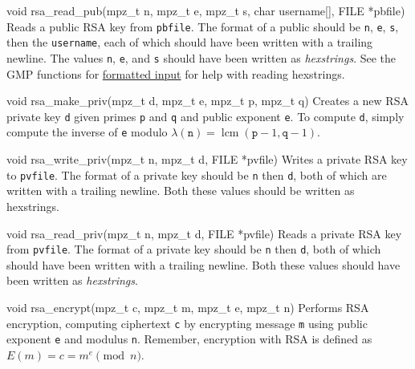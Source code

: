 \begin{funcdoc}{void rsa\_read\_pub(mpz\_t n, mpz\_t e, mpz\_t s,
char username[], FILE *pbfile)}
  Reads a public RSA key from \texttt{pbfile}. The format of a public
  should be \texttt{n}, \texttt{e}, \texttt{s}, then the
  \texttt{username}, each of which should have been written with a
  trailing newline. The values \texttt{n}, \texttt{e}, and \texttt{s}
  should have been written as \emph{hexstrings}. See the GMP functions
  for
  \href{https://gmplib.org/manual/Formatted-Input-Functions}{formatted
  input} for help with reading hexstrings.
\end{funcdoc}

\begin{funcdoc}{void rsa\_make\_priv(mpz\_t d, mpz\_t e, mpz\_t
p, mpz\_t q)}
  Creates a new RSA private key \texttt{d} given primes \texttt{p} and
  \texttt{q} and public exponent \texttt{e}. To compute \texttt{d}, simply
  compute the inverse of \texttt{e} modulo $\lambda(\texttt{n}) =
  \operatorname{lcm}(\texttt{p} - 1, \texttt{q} - 1)$.
\end{funcdoc}

\begin{funcdoc}{void rsa\_write\_priv(mpz\_t n, mpz\_t d, FILE
*pvfile)}
  Writes a private RSA key to \texttt{pvfile}. The format of a private key
  should be \texttt{n} then \texttt{d}, both of which are written with a
  trailing newline. Both these values should be written as hexstrings.
\end{funcdoc}

\begin{funcdoc}{void rsa\_read\_priv(mpz\_t n, mpz\_t d, FILE
*pvfile)}
  Reads a private RSA key from \texttt{pvfile}. The format of a private
  key should be \texttt{n} then \texttt{d}, both of which should have
  been written with a trailing newline. Both these values should have
  been written as \emph{hexstrings}.
\end{funcdoc}

\begin{funcdoc}{void rsa\_encrypt(mpz\_t c, mpz\_t m, mpz\_t e,
mpz\_t n)}
  Performs RSA encryption, computing ciphertext \texttt{c} by encrypting
  message \texttt{m} using public exponent \texttt{e} and modulus
  \texttt{n}. Remember, encryption with RSA is defined as $E(m) = c =
        m^e \pmod{n}$.
\end{funcdoc}

